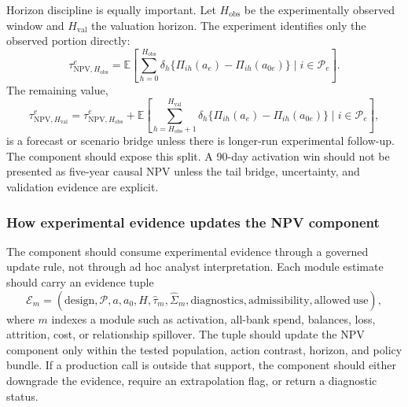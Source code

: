 \documentclass[11pt]{article}
\newcommand{\E}{\mathbb{E}}
\newcommand{\NPV}{\mathrm{NPV}}
\newcommand{\1}{\mathbf{1}}
\begin{document}
Horizon discipline is equally important. Let $H_{\mathrm{obs}}$ be the
experimentally observed window and $H_{\mathrm{val}}$ the valuation horizon.
The experiment identifies only the observed portion directly:
\begin{equation}
  \tau^{e}_{\NPV,H_{\mathrm{obs}}}
  =
  \E\!\left[
    \sum_{h=0}^{H_{\mathrm{obs}}}\delta_h
    \{\Pi_{ih}(a_e)-\Pi_{ih}(a_{0e})\}
    \mid i\in\mathcal{P}_e
  \right].
  \label{eq:observed-horizon-npv}
\end{equation}
The remaining value,
\begin{equation}
  \tau^{e}_{\NPV,H_{\mathrm{val}}}
  =
  \tau^{e}_{\NPV,H_{\mathrm{obs}}}
  +
  \E\!\left[
    \sum_{h=H_{\mathrm{obs}}+1}^{H_{\mathrm{val}}}\delta_h
    \{\Pi_{ih}(a_e)-\Pi_{ih}(a_{0e})\}
    \mid i\in\mathcal{P}_e
  \right],
  \label{eq:horizon-bridge}
\end{equation}
is a forecast or scenario bridge unless there is longer-run experimental
follow-up. The component should expose this split. A 90-day activation win
should not be presented as five-year causal NPV unless the tail bridge,
uncertainty, and validation evidence are explicit.

\subsubsection{How experimental evidence updates the NPV component}

The component should consume experimental evidence through a governed update
rule, not through ad hoc analyst interpretation. Each module estimate should
carry an evidence tuple
\begin{equation}
  \mathcal{E}_{m}
  =
  (\mathrm{design},\mathcal{P},a,a_0,H,\widehat{\tau}_m,
   \widehat{\Sigma}_m,\mathrm{diagnostics},\mathrm{admissibility},
   \mathrm{allowed\ use}),
  \label{eq:evidence-tuple}
\end{equation}
where $m$ indexes a module such as activation, all-bank spend, balances, loss,
attrition, cost, or relationship spillover. The tuple should update the NPV
component only within the tested population, action contrast, horizon, and
policy bundle. If a production call is outside that support, the component
should either downgrade the evidence, require an extrapolation flag, or return
a diagnostic status.
\end{document}
